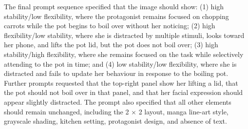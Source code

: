 \documentclass[12pt,a4paper]{report}
\begin{document}
\begin{appendices}
The final prompt sequence specified that the image should show: 
(1) high stability/low flexibility, where the protagonist remains focused on chopping carrots while the pot begins to boil over without her noticing; 
(2) high flexibility/low stability, where she is distracted by multiple stimuli, looks toward her phone, and lifts the pot lid, but the pot does not boil over; 
(3) high stability/high flexibility, where she remains focused on the task while selectively attending to the pot in time; and 
(4) low stability/low flexibility, where she is distracted and fails to update her behaviour in response to the boiling pot. 
Further prompts requested that the top-right panel show her lifting a lid, that the pot should not boil over in that panel, and that her facial expression should appear slightly distracted. The prompt also specified that all other elements should remain unchanged, including the 2 \(\times\) 2 layout, manga line-art style, grayscale shading, kitchen setting, protagonist design, and absence of text.


\end{appendices}
\end{document}
